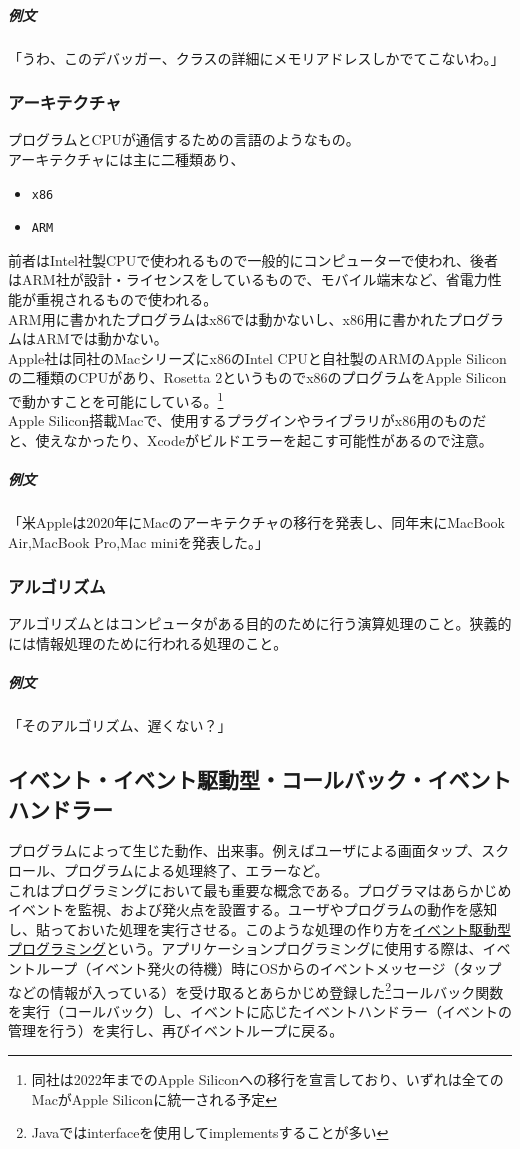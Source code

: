 \documentclass[a4paper]{ltjsreport}
\newcommand{\terlogy}[2][|]{\colorbox{terlogy}{\texttt{\lstinline#1#2#1}}}
\begin{document}
\subparagraph{例文} 「うわ、このデバッガー、クラスの詳細にメモリアドレスしかでてこないわ。」

\subsubsection{アーキテクチャ}
プログラムとCPUが通信するための言語のようなもの。\\
アーキテクチャには主に二種類あり、
\begin{itemize}
  \item \terlogy{x86}
  \item \terlogy{ARM}
\end{itemize}
前者はIntel社製CPUで使われるもので一般的にコンピューターで使われ、後者はARM社が設計・ライセンスをしているもので、モバイル端末など、省電力性能が重視されるもので使われる。\\
ARM用に書かれたプログラムはx86では動かないし、x86用に書かれたプログラムはARMでは動かない。\\
Apple社は同社のMacシリーズにx86のIntel CPUと自社製のARMのApple Siliconの二種類のCPUがあり、Rosetta 2というものでx86のプログラムをApple Siliconで動かすことを可能にしている。\footnote{同社は2022年までのApple Siliconへの移行を宣言しており、いずれは全てのMacがApple Siliconに統一される予定}\\
Apple Silicon搭載Macで、使用するプラグインやライブラリがx86用のものだと、使えなかったり、Xcodeがビルドエラーを起こす可能性があるので注意。

\subparagraph{例文} 「米Appleは2020年にMacのアーキテクチャの移行を発表し、同年末にMacBook Air,MacBook Pro,Mac miniを発表した。」

\subsubsection{アルゴリズム}
アルゴリズムとはコンピュータがある目的のために行う演算処理のこと。狭義的には情報処理のために行われる処理のこと。

\subparagraph{例文} 「そのアルゴリズム、遅くない？」

\subsection{イベント・イベント駆動型・コールバック・イベントハンドラー}
プログラムによって生じた動作、出来事。例えばユーザによる画面タップ、スクロール、プログラムによる処理終了、エラーなど。
\\

これはプログラミングにおいて最も重要な概念である。プログラマはあらかじめイベントを監視、および発火点を設置する。ユーザやプログラムの動作を感知し、貼っておいた処理を実行させる。このような処理の作り方を\underline{イベント駆動型プログラミング}という。アプリケーションプログラミングに使用する際は、イベントループ（イベント発火の待機）時にOSからのイベントメッセージ（タップなどの情報が入っている）を受け取るとあらかじめ登録した\footnote{Javaではinterfaceを使用してimplementsすることが多い}コールバック関数を実行（コールバック）し、イベントに応じたイベントハンドラー（イベントの管理を行う）を実行し、再びイベントループに戻る。
\end{document}
